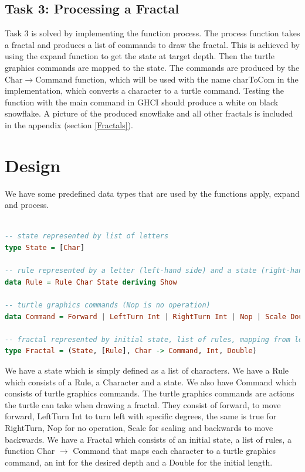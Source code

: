 \documentclass{article}
\begin{document}
\subsection{Task 3: Processing a Fractal}
Task 3 is solved by implementing the function process. The process function takes a fractal and produces a list of commands to draw the fractal. This is achieved by using the expand function to get the state at target depth. Then the turtle graphics commands are mapped to the state. The commands are produced by the Char$\rightarrow$Command function, which will be used with the name charToCom in the implementation, which converts a character to a turtle command. Testing the function with the main command in GHCI should produce a white on black snowflake. A picture of the produced snowflake and all other fractals is included in the appendix (section \ref{Fractals}).

\section{Design}
We have some predefined data types that are used by the functions apply, expand and process.

\begin{lstlisting}[language=Haskell]

-- state represented by list of letters
type State = [Char]

-- rule represented by a letter (left-hand side) and a state (right-hand side)
data Rule = Rule Char State deriving Show

-- turtle graphics commands (Nop is no operation)
data Command = Forward | LeftTurn Int | RightTurn Int | Nop | Scale Double | Backward deriving Show 

-- fractal represented by initial state, list of rules, mapping from letters to commands, target depth, initial length
type Fractal = (State, [Rule], Char -> Command, Int, Double)
\end{lstlisting}

We have a state which is simply defined as a list of characters. We have a Rule which consists of a Rule, a Character and a state. We also have Command which consists of turtle graphics commands. The turtle graphics commands are actions the turtle can take when drawing a fractal. They consist of forward, to move forward, LeftTurn Int to turn left with specific degrees, the same is true for RightTurn, Nop for no operation, Scale for scaling and backwards to move backwards. We have a Fractal which consists of an initial state, a list of rules, a function Char $\rightarrow$ Command that maps each character to a turtle graphics command, an int for the desired depth and a Double for the initial length.
\end{document}
